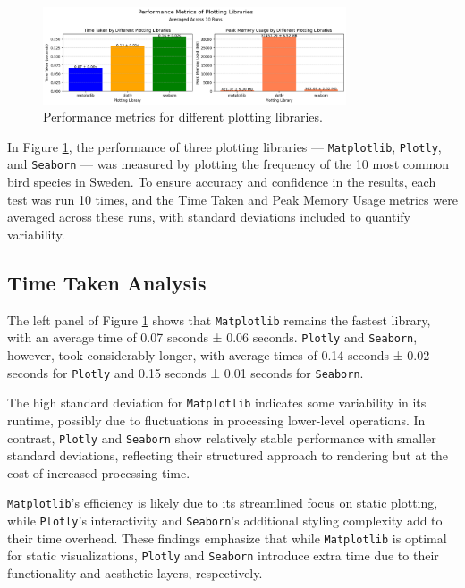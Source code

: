 \begin{figure}[H]
    \centering
    \includegraphics[width=0.8\textwidth]{figures/barplot_performance.png}
    \caption{Performance metrics for different plotting libraries.}
    \label{fig:performance2}
\end{figure}

In Figure \ref{fig:performance2}, the performance of three plotting libraries --- \texttt{Matplotlib}, \texttt{Plotly}, and \texttt{Seaborn} --- was measured by plotting the frequency of the 10 most common bird species in Sweden. To ensure accuracy and confidence in the results, each test was run 10 times, and the Time Taken and Peak Memory Usage metrics were averaged across these runs, with standard deviations included to quantify variability.

\subsection{Time Taken Analysis}

The left panel of Figure \ref{fig:performance2} shows that \texttt{Matplotlib} remains the fastest library, with an average time of 0.07 seconds ± 0.06 seconds. \texttt{Plotly} and \texttt{Seaborn}, however, took considerably longer, with average times of 0.14 seconds ± 0.02 seconds for \texttt{Plotly} and 0.15 seconds ± 0.01 seconds for \texttt{Seaborn}.

The high standard deviation for \texttt{Matplotlib} indicates some variability in its runtime, possibly due to fluctuations in processing lower-level operations. In contrast, \texttt{Plotly} and \texttt{Seaborn} show relatively stable performance with smaller standard deviations, reflecting their structured approach to rendering but at the cost of increased processing time.

\texttt{Matplotlib}'s efficiency is likely due to its streamlined focus on static plotting, while \texttt{Plotly}'s interactivity and \texttt{Seaborn}'s additional styling complexity add to their time overhead. These findings emphasize that while \texttt{Matplotlib} is optimal for static visualizations, \texttt{Plotly} and \texttt{Seaborn} introduce extra time due to their functionality and aesthetic layers, respectively.

